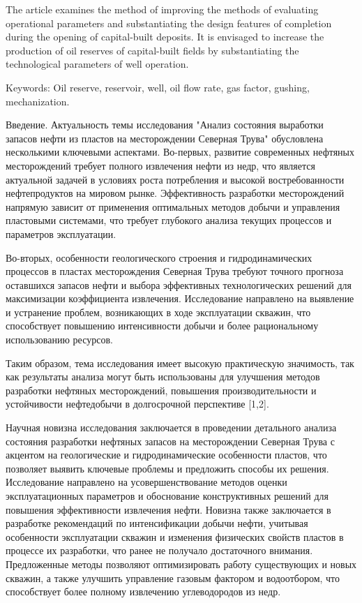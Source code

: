 The article examines the method of improving the methods of evaluating
operational parameters and substantiating the design features of
completion during the opening of capital-built deposits. It is envisaged
to increase the production of oil reserves of capital-built fields by
substantiating the technological parameters of well operation.

Keywords: Oil reserve, reservoir, well, oil flow rate, gas factor,
gushing, mechanization.

Введение. Актуальность темы исследования "Анализ состояния выработки
запасов нефти из пластов на месторождении Северная Трува" обусловлена
несколькими ключевыми аспектами. Во-первых, развитие современных
нефтяных месторождений требует полного извлечения нефти из недр, что
является актуальной задачей в условиях роста потребления и высокой
востребованности нефтепродуктов на мировом рынке. Эффективность
разработки месторождений напрямую зависит от применения оптимальных
методов добычи и управления пластовыми системами, что требует глубокого
анализа текущих процессов и параметров эксплуатации.

Во-вторых, особенности геологического строения и гидродинамических
процессов в пластах месторождения Северная Трува требуют точного
прогноза оставшихся запасов нефти и выбора эффективных технологических
решений для максимизации коэффициента извлечения. Исследование
направлено на выявление и устранение проблем, возникающих в ходе
эксплуатации скважин, что способствует повышению интенсивности добычи и
более рациональному использованию ресурсов.

Таким образом, тема исследования имеет высокую практическую значимость,
так как результаты анализа могут быть использованы для улучшения методов
разработки нефтяных месторождений, повышения производительности и
устойчивости нефтедобычи в долгосрочной перспективе {[}1,2{]}.

Научная новизна исследования заключается в проведении детального анализа
состояния разработки нефтяных запасов на месторождении Северная Трува с
акцентом на геологические и гидродинамические особенности пластов, что
позволяет выявить ключевые проблемы и предложить способы их решения.
Исследование направлено на усовершенствование методов оценки
эксплуатационных параметров и обоснование конструктивных решений для
повышения эффективности извлечения нефти. Новизна также заключается в
разработке рекомендаций по интенсификации добычи нефти, учитывая
особенности эксплуатации скважин и изменения физических свойств пластов
в процессе их разработки, что ранее не получало достаточного внимания.
Предложенные методы позволяют оптимизировать работу существующих и новых
скважин, а также улучшить управление газовым фактором и водоотбором, что
способствует более полному извлечению углеводородов из недр.

